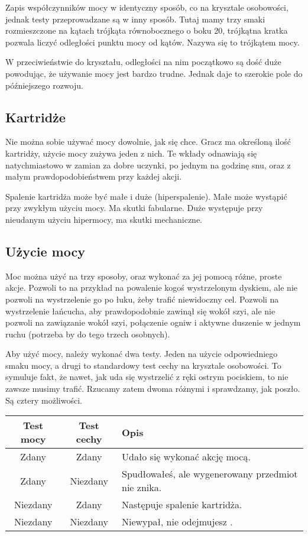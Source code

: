 Zapis współczynników mocy w identyczny sposób, co na krysztale osobowości, jednak testy przeprowadzane są w inny sposób.
Tutaj mamy trzy smaki rozmieszczone na kątach trójkąta równobocznego o boku 20, trójkątna kratka pozwala liczyć odległości punktu mocy od kątów.
Nazywa się to trójkątem mocy.

W przeciwieństwie do kryształu, odległości na nim początkowo są dość duże powodując, że używanie mocy jest bardzo trudne.
Jednak daje to szerokie pole do późniejszego rozwoju.

\subsection{Kartridże}
Nie można sobie używać mocy dowolnie, jak się chce.
Gracz ma określoną ilość kartridży, użycie mocy zużywa jeden z nich.
Te wkłady odnawiają się natychmiastowo w zamian za dobre uczynki, po jednym na godzinę snu, oraz z małym prawdopodobieństwem przy każdej akcji.

Spalenie kartridża może być małe i duże (hiperspalenie).
Małe może wystąpić przy zwykłym użyciu mocy. Ma skutki fabularne.
Duże występuje przy nieudanym użyciu hipermocy, ma skutki mechaniczne.

\subsection{Użycie mocy}
Moc można użyć na trzy sposoby, oraz wykonać za jej pomocą różne, proste akcje.
Pozwoli to na przykład na powalenie kogoś wystrzelonym dyskiem, ale nie pozwoli na wystrzelenie go po łuku, żeby trafić niewidoczny cel.
Pozwoli na wystrzelenie łańcucha, aby prawdopodobnie zawinął się wokół szyi, ale nie pozwoli na zawiązanie wokół szyi, połączenie ogniw i aktywne duszenie w jednym ruchu (potrzeba by do tego trzech osobnych).

Aby użyć mocy, należy wykonać dwa testy. Jeden na użycie odpowiedniego smaku mocy, a drugi to standardowy test cechy na krysztale osobowości.
To symuluje fakt, że nawet, jak uda się wystrzelić z ręki ostrym pociskiem, to nie zawsze musimy trafić.
Rzucamy zatem dwoma różnymi \dxx{} i sprawdzamy, jak poszło. Są cztery możliwości.

\begin{tabular}{c c l}
Test mocy	&	Test cechy	& Opis	\\
\hline
Zdany		&	Zdany		& Udało się wykonać akcję mocą. \\
Zdany 		&	Niezdany	& Spudłowałeś, ale wygenerowany przedmiot nie znika. \\
Niezdany	&	Zdany		& Następuje spalenie kartridża. \\
Niezdany	&	Niezdany	& Niewypał, nie odejmujesz \abkar{}. \\
\end{tabular}

